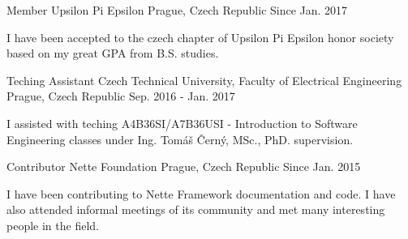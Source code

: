 \begin{cventries}
  \cventry
    {Member}
    {Upsilon Pi Epsilon}
    {Prague, Czech Republic}
    {Since Jan. 2017}
    {
      \begin{cvitems}
        \item {I have been accepted to the czech chapter of Upsilon Pi Epsilon honor society based on my great GPA from B.S. studies.}
      \end{cvitems}
    }
  \cventry
    {Teching Assistant}
    {Czech Technical University, Faculty of Electrical Engineering}
    {Prague, Czech Republic}
    {Sep. 2016 - Jan. 2017}
    {
      \begin{cvitems}
        \item {I assisted with teching A4B36SI/A7B36USI - Introduction to Software Engineering classes under Ing. Tomáš Černý, MSc., PhD. supervision.}
      \end{cvitems}
    }
  \cventry
    {Contributor}
    {Nette Foundation}
    {Prague, Czech Republic}
    {Since Jan. 2015}
    {
      \begin{cvitems}
        \item {I have been contributing to Nette Framework documentation and code. I have also attended informal meetings of its community and met many interesting people in the field.}
      \end{cvitems}
    }
\end{cventries}
